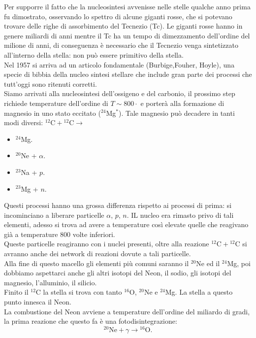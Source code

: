 Per supporre il fatto che la nucleosintesi avvenisse nelle stelle qualche anno prima fu dimostrato, osservando lo spettro di alcune giganti rosse, che si potevano trovare delle righe di assorbimento del Tecnezio (Tc). Le giganti rosse hanno in genere miliardi di anni mentre il Tc ha un tempo di dimezzamento dell'ordine del milione di anni, di conseguenza è necessario che il Tecnezio venga sintetizzato all'interno della stella: non può essere primitivo della stella.\\
Nel 1957 si arriva ad un articolo fondamentale (Burbige,Fouher, Hoyle), una specie di bibbia della nucleo sintesi stellare che include gran parte dei processi che tutt'oggi sono ritenuti corretti.\\
Siamo arrivati alla nucleosintesi dell'ossigeno e del carbonio, il prossimo step richiede temperature dell'ordine di $T\sim 800\cdot $ e porterà alla formazione di magnesio in uno stato eccitato (${}^{24}$Mg$^*$). 
Tale magnesio può decadere in tanti modi diversi: ${}^{12}\text{C}+{}^{12}\text{C}\to $  
\begin{itemize}
    \item ${}^{24}$Mg.
    \item ${}^{20}$Ne + $\alpha$.
    \item ${}^{23}$Na + $p$.
    \item ${}^{23}$Mg + $n$.
\end{itemize}
Questi processi hanno una grossa differenza rispetto ai processi di prima: si incominciano a liberare particelle $\alpha$, $p$, $n$. IL nucleo era rimasto privo di tali elementi, adesso si trova ad avere a temperature così elevate quelle che reagivano già a temperature 800 volte inferiori.\\
Queste particelle reagiranno con i nuclei presenti, oltre alla reazione ${}^{12}\text{C}+{}^{12}\text{C}$ si avranno anche dei network di reazioni dovute a tali particelle.\\
Alla fine di questo macello gli elementi più comuni saranno il ${}^{20}$Ne ed il ${}^{24}$Mg, poi dobbiamo aspettarci anche gli altri isotopi del Neon, il sodio, gli isotopi del magnesio, l'alluminio, il silicio. \\
Finito il ${}^{12}$C la stella si trova con tanto ${}^{16}$O, ${}^{20}$Ne e ${}^{24}$Mg. La stella a questo punto innesca il Neon. \\
La combustione del Neon avviene a temperature dell'ordine del miliardo di gradi, la prima reazione che questo fa è una fotodisintegrazione:
\[
    {}^{20}\text{Ne} + \gamma  \to {}^{16}\text{O}
.\] 
